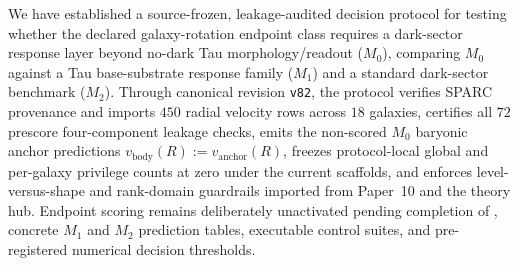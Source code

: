 \documentclass[11pt]{article}
\begin{document}
We have established a source-frozen, leakage-audited decision protocol for testing whether the declared galaxy-rotation endpoint class requires a dark-sector response layer beyond no-dark Tau morphology/readout ($M_0$), comparing $M_0$ against a Tau base-substrate response family ($M_1$) and a standard dark-sector benchmark ($M_2$). Through canonical revision \texttt{v82}, the protocol verifies SPARC provenance and imports $450$ radial velocity rows across $18$ galaxies, certifies all $72$ prescore four-component leakage checks, emits the non-scored $M_0$ baryonic anchor predictions $v_{\mathrm{body}}(R):=v_{\mathrm{anchor}}(R)$, freezes protocol-local global and per-galaxy privilege counts at zero under the current scaffolds, and enforces level-versus-shape and rank-domain guardrails imported from Paper~10 and the theory hub. Endpoint scoring remains deliberately unactivated pending completion of , concrete $M_1$ and $M_2$ prediction tables, executable control suites, and pre-registered numerical decision thresholds.



\end{document}
